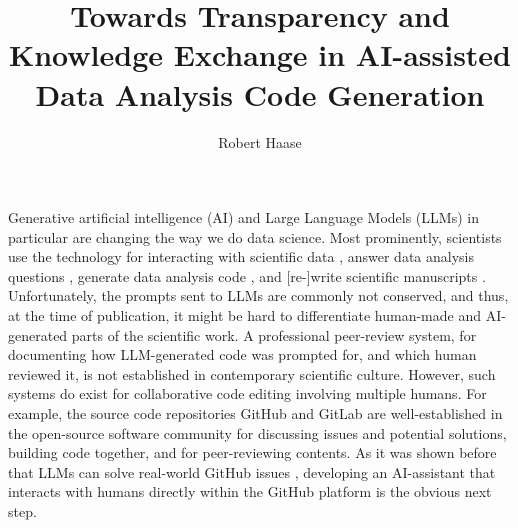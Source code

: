 \documentclass[sn-mathphys-num]{sn-jnl}%
\theoremstyle{thmstyleone}%
\theoremstyle{thmstyletwo}%
\theoremstyle{thmstylethree}%
\begin{document}
\title[Towards Transparency and Knowledge Exchange in AI-assisted Data Analysis Code Generation]{Towards Transparency and Knowledge Exchange in AI-assisted Data Analysis Code Generation}


\author[1,2]{Robert Haase}




\maketitle

Generative artificial intelligence (AI) and Large Language Models (LLMs) in particular are changing the way we do data science. Most prominently, scientists use the technology for interacting with scientific data \cite{Royer2023}, answer data analysis questions \cite{Lai2022DS1000, lei2024bioimage}, generate data analysis code \cite{Royer2024, benchmark_llm_bia, chen2021evaluating}, and [re-]write scientific manuscripts \cite{lu2024aiscientist}. Unfortunately, the prompts sent to LLMs are commonly not conserved, and thus, at the time of publication, it might be hard to differentiate human-made and AI-generated parts of the scientific work. A professional peer-review system, for documenting how LLM-generated code was prompted for, and which human reviewed it, is not established in contemporary scientific culture. However, such systems do exist for collaborative code editing involving multiple humans. For example, the source code repositories GitHub and GitLab are well-established in the open-source software community for discussing issues and potential solutions, building code together, and for peer-reviewing contents. As it was shown before that LLMs can solve real-world GitHub issues \cite{jimenez2024swebenchlanguagemodelsresolve}, developing an AI-assistant that interacts with humans directly within the GitHub platform is the obvious next step. 
\end{document}
